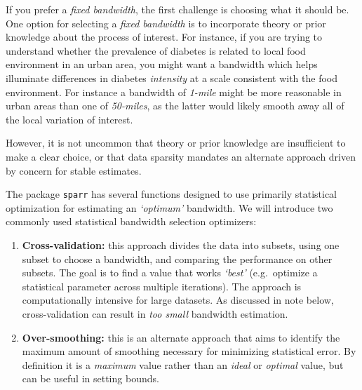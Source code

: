 \documentclass[
]{book}
\providecommand{\tightlist}{%
  \setlength{\itemsep}{0pt}\setlength{\parskip}{0pt}}
\begin{document}
If you prefer a \emph{fixed bandwidth}, the first challenge is choosing what it should be. One option for selecting a \emph{fixed bandwidth} is to incorporate theory or prior knowledge about the process of interest. For instance, if you are trying to understand whether the prevalence of diabetes is related to local food environment in an urban area, you might want a bandwidth which helps illuminate differences in diabetes \emph{intensity} at a scale consistent with the food environment. For instance a bandwidth of \emph{1-mile} might be more reasonable in urban areas than one of \emph{50-miles}, as the latter would likely smooth away all of the local variation of interest.

However, it is not uncommon that theory or prior knowledge are insufficient to make a clear choice, or that data sparsity mandates an alternate approach driven by concern for stable estimates.

The package \texttt{sparr} has several functions designed to use primarily statistical optimization for estimating an \emph{`optimum'} bandwidth. We will introduce two commonly used statistical bandwidth selection optimizers:

\begin{enumerate}
\def\labelenumi{\arabic{enumi}.}
\tightlist
\item
  \textbf{Cross-validation:} this approach divides the data into subsets, using one subset to choose a bandwidth, and comparing the performance on other subsets. The goal is to find a value that works \emph{`best'} (e.g.~optimize a statistical parameter across multiple iterations). The approach is computationally intensive for large datasets. As discussed in note below, cross-validation can result in \emph{too small} bandwidth estimation.
\item
  \textbf{Over-smoothing:} this is an alternate approach that aims to identify the maximum amount of smoothing necessary for minimizing statistical error. By definition it is a \emph{maximum} value rather than an \emph{ideal} or \emph{optimal} value, but can be useful in setting bounds.
\end{enumerate}
\end{document}
